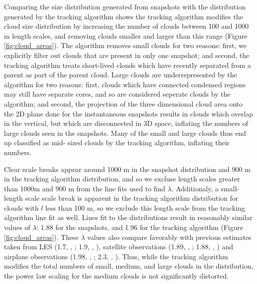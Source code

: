 \documentclass[acp]{copernicus}
\begin{document}
Comparing the size distribution generated from snapshots with the distribution 
generated by the tracking algorithm shows the tracking algorithm modifies
the cloud size distribution by increasing the number of clouds between 100 and 
1000 m length scales, and removing clouds smaller and larger than this range 
(Figure \ref{fig:cloud_areas}).  The algorithm removes small clouds for two 
reasons: first, we explicitly filter out clouds that are present in only one 
snapshot; and second, the tracking algorithm treats short-lived clouds which 
have recently separated from a parent as part of the parent cloud.  Large
clouds are underrepresented by the algorithm for two reasons: first, clouds 
which have connected condensed regions may still have separate cores, and so 
are considered seperate clouds by the algorithm; and second, the projection of 
the three dimensional cloud area onto the 2D plane done for the instantaneous 
snapshots results in clouds which overlap in the vertical, but which are 
disconnected in 3D space, inflating the numbers of large clouds seen in the 
snapshots.  Many of the small and large clouds thus end up classified as mid-
sized clouds by the tracking algorithm, inflating their numbers.

Clear scale breaks appear around 1000 m in the snapshot distribution and 900 m 
in the tracking algorithm distribution, and so we excluse length scales greater 
than 1000m and 900 m from the line fits used to find $\lambda$.  Additionaly, 
a small-length scale scale break is apparent in the tracking algorithm 
distribution for clouds with $l$ less than 100 m, so we exclude this length 
scale from the tracking algorithm line fit as well.  Lines fit to the 
distributions result in reasonably similar values of $\lambda$: 1.88 for 
the snapshots, and 1.96 for the tracking algorithm (Figure 
\ref{fig:cloud_areas}).  These $\lambda$ values also compare favorably 
with previous estimates taken from LES (1.7, \citeauthor{Neggers2003},
\citeyear{Neggers2003}; 1.9, \citeauthor{Jiang2008}, \citeyear{Jiang2008}), 
satellite observations (1.89, \citeauthor{Cahalan1989},
\citeyear{Cahalan1989}; 1.88, \citeauthor{Zhao2007}, \citeyear{Zhao2007})
and airplane observations (1.98, \citeauthor{Benner1998}, 
\citeyear{Benner1998}; 2.3, \citeauthor{Jiang2008}, \citeyear{Jiang2008}).
Thus, while the tracking algorithm modifies the total numbers of small, medium, 
and large clouds in the distribution, the power law scaling for the medium 
clouds is not significantly distorted.

\end{document}
